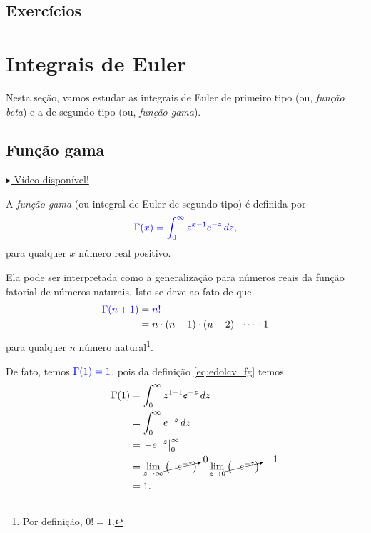 \subsection*{Exercícios}

\emconstrucao

\section{Integrais de Euler}\label{cap_edolcv_sec_ieuler}

Nesta seção, vamos estudar as integrais de Euler de primeiro tipo (ou, \emph{função beta}) e a de segundo tipo (ou, \emph{função gama}).

\subsection{Função gama}

\begin{flushright}
  \href{https://archive.org/details/funcao-gama}{$\blacktriangleright$ Vídeo disponível!}
\end{flushright}

A \emph{função gama} (ou integral de Euler de segundo tipo) é definida por
\begin{equation}\label{eq:edolcv_fg}
  {\color{blue}\Gamma(x) = \int_0^\infty z^{x-1}e^{-z}\,dz},
\end{equation}
para qualquer $x$ número real positivo.

Ela pode ser interpretada como a generalização para números reais da função fatorial de números naturais. Isto se deve ao fato de que
\begin{align}
  {\color{blue}\Gamma(n+1)} &= {\color{blue}n!}\\
                            &= n\cdot (n-1)\cdot (n-2)\cdot\, \cdots\, \cdot 1
\end{align}
para qualquer $n$ número natural\footnote{Por definição, $0!=1$.}.

De fato, temos ${\color{blue}\Gamma(1) = 1}$, pois da definição \eqref{eq:edolcv_fg} temos
\begin{align}
  \Gamma(1) &= \int_0^\infty z^{1-1}e^{-z}\,dz\\
            &= \int_0^\infty e^{-z}\,dz\\
            &= \left.-e^{-z}\right|_{0}^{\infty}\\
            &= \lim_{z\to\infty} \cancelto{0}{\left(-e^{-z}\right)} - \lim_{z\to 0} \cancelto{-1}{\left(-e^{-z}\right)}\\
            &= 1.
\end{align}

